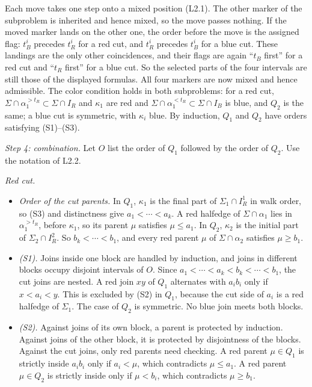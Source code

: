 \documentclass[
  11pt,
]{article}
\providecommand{\tightlist}{%
  \setlength{\itemsep}{0pt}\setlength{\parskip}{0pt}}
\begin{document}
Each move takes one step onto a mixed position (L2.1). The other marker
of the subproblem is inherited and hence mixed, so the move passes
nothing. If the moved marker lands on the other one, the order before
the move is the assigned flag: \(t_B^i\) precedes \(t_R^i\) for a red
cut, and \(t_R^i\) precedes \(t_B^i\) for a blue cut. These landings are
the only other coincidences, and their flags are again ``\(t_B\) first''
for a red cut and ``\(t_R\) first'' for a blue cut. So the selected
parts of the four intervals are still those of the displayed formulas.
All four markers are now mixed and hence admissible. The color condition
holds in both subproblems: for a red cut,
\(\Sigma\cap\alpha_1^{>t_R}\subset\Sigma\cap I_R\) and \(\kappa_1\) are
red and \(\Sigma\cap\alpha_1^{<t_R}\subset\Sigma\cap I_B\) is blue, and
\(Q_2\) is the same; a blue cut is symmetric, with \(\kappa_i\) blue. By
induction, \(Q_1\) and \(Q_2\) have orders satisfying (S1)--(S3).

\emph{Step 4: combination.} Let \(O\) list the order of \(Q_1\) followed
by the order of \(Q_2\). Use the notation of L2.2.

\emph{Red cut.}

\begin{itemize}
\tightlist
\item
  \emph{Order of the cut parents.} In \(Q_1\), \(\kappa_1\) is the final
  part of \(\Sigma_1\cap I_R^1\) in walk order, so (S3) and distinctness
  give \(a_1<\cdots<a_k\). A red halfedge of \(\Sigma\cap\alpha_1\) lies
  in \(\alpha_1^{>t_R}\), before \(\kappa_1\), so its parent \(\mu\)
  satisfies \(\mu\le a_1\). In \(Q_2\), \(\kappa_2\) is the initial part
  of \(\Sigma_2\cap I_R^2\). So \(b_k<\cdots<b_1\), and every red parent
  \(\mu\) of \(\Sigma\cap\alpha_2\) satisfies \(\mu\ge b_1\).
\item
  \emph{(S1).} Joins inside one block are handled by induction, and
  joins in different blocks occupy disjoint intervals of \(O\). Since
  \(a_1<\cdots<a_k<b_k<\cdots<b_1\), the cut joins are nested. A red
  join \(xy\) of \(Q_1\) alternates with \(a_ib_i\) only if \(x<a_i<y\).
  This is excluded by (S2) in \(Q_1\), because the cut side of \(a_i\)
  is a red halfedge of \(\Sigma_1\). The case of \(Q_2\) is symmetric.
  No blue join meets both blocks.
\item
  \emph{(S2).} Against joins of its own block, a parent is protected by
  induction. Against joins of the other block, it is protected by
  disjointness of the blocks. Against the cut joins, only red parents
  need checking. A red parent \(\mu\in Q_1\) is strictly inside
  \(a_ib_i\) only if \(a_i<\mu\), which contradicts \(\mu\le a_1\). A
  red parent \(\mu\in Q_2\) is strictly inside only if \(\mu<b_i\),
  which contradicts \(\mu\ge b_1\).
\end{itemize}
\end{document}
